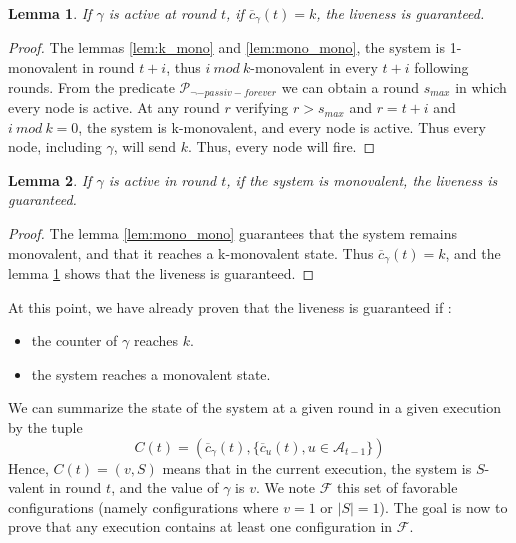 \documentclass{article}
\newtheorem{lemma}{Lemma}[section]
\newcommand{\cent}{\gamma}
\begin{document}
\begin{lemma}\label{lem:k_liv}
	If $\cent$ is active at round $t$, if $\overline{c}_\cent(t) = k$, the liveness is guaranteed.
\end{lemma}
\begin{proof}
	The lemmas \ref{lem:k_mono} and \ref{lem:mono_mono}, the system is 1-monovalent in round $t+i$,
	thus $i~mod~k$-monovalent in every $t+i$ following rounds.
	From the predicate $\mathcal{P}_{\neg-passiv-forever}$ we can obtain a round $s_{max}$ in which every node is active.
	At any round $r$ verifying $r > s_{max}$ and $r = t + i$ and $i~mod~k = 0$, the system is k-monovalent,
	and every node is active. Thus every node, including $\cent$, will send $k$.
	Thus, every node will fire.
\end{proof}
 
\begin{lemma}\label{lem:mono_liv}
	If $\cent$ is active in round $t$, if the system is monovalent, the liveness is guaranteed.
\end{lemma}
\begin{proof}
	The lemma \ref{lem:mono_mono} guarantees that the system remains monovalent, and that it reaches a
	k-monovalent state.
	Thus $\overline{c}_\cent(t) = k$, and the lemma \ref{lem:k_liv} shows that the liveness is guaranteed.
\end{proof}

\noindent At this point, we have already proven that the liveness is guaranteed if :
\begin{itemize}
	\item the counter of $\cent$ reaches $k$.
	\item the system reaches a monovalent state.
\end{itemize}

We can summarize the state of the system at a given round in a given execution by the tuple
$$C(t) = (\overline{c}_\cent(t), \{\overline{c}_u(t), u \in \mathcal{A}_{t-1}\})$$
Hence, $C(t) = (v, S)$ means that in the current execution, the system is $S$-valent in round $t$, and the value of $\cent$ is $v$.
We note $\mathcal{F}$ this set of favorable configurations (namely configurations where $v = 1$ or $| S | = 1$).
The goal is now to prove that any execution contains at least one configuration in $\mathcal{F}$.
\end{document}

